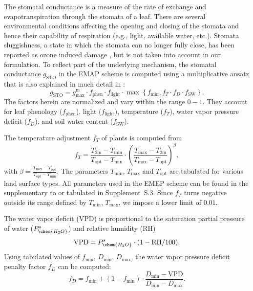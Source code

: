 \documentclass[gmd, manuscript]{copernicus}
\begin{document}
The stomatal conductance is a measure of the rate of  exchange and evapotranspiration through the stomata of a leaf. There are several environmental conditions affecting the opening and closing of the stomata and hence their capability of respiration (e.g., light, available water, etc.). Stomata sluggishness, a state in which the stomata can no longer fully close, has been reported as ozone induced damage \citep{SR:Hoshika2015}, but is not taken into account in our formulation. To reflect part of the underlying mechanism, the stomatal conductance $g_\text{STO}$ in the EMAP scheme is computed using a multiplicative ansatz that is also explained in much detail in \citet{ICP:MappingManual2017}:
%
\begin{equation}
  g_\text{STO} = g^\text{m}_\text{max} \cdot f_\text{phen} \cdot f_\text{light} \cdot \max{\left\{f_\text{min}, f_T \cdot f_D \cdot f_\text{SW}\right\}}.
  \label{eq:stomatal}
\end{equation}
%
The factors herein are normalized and vary within the range $0-1$. They account for leaf phenology ($f_\text{phen}$), light ($f_\text{light}$), temperature ($f_T$), water vapor pressure deficit ($f_D$), and soil water content ($f_\text{SW}$).

The temperature adjustment $f_T$ of plants is computed from
%
\begin{equation}
  f_T = \frac{T_\text{2m}-T_\text{min}}{T_\text{opt}-T_\text{min}} \cdot \left(\frac{T_{\text{max}}-T_\text{2m}}{T_{\text{max}}-T_\text{opt}}\right)^\beta, 
\end{equation}
with $\beta = \frac{T_\text{max}-T_\text{opt}}{T_\text{opt}-T_\text{min}}$. The parameters $T_\text{min}$, $T_\text{max}$ and $T_\text{opt}$ are tabulated for various land surface types. All parameters used in the EMEP scheme can be found in the supplementary to \citet{ACP:Simpson2012} or tabulated in Supplement~S.3. Since $f_T$ turns negative outside its range defined by $T_\text{min}$, $T_\text{max}$, we impose a lower limit of $0.01$.

The water vapor deficit (VPD) is proportional to the saturation partial pressure of water ($P_\chem{H_2O}^s$) and relative humidity ($\text{RH}$)
%
\begin{equation}
  \text{VPD} = P_\chem{H_2O}^s \cdot (1 - \text{RH}/100).
\end{equation}
%
Using tabulated values of $f_\text{min}$, $D_\text{min}$, $D_\text{max}$, the water vapor pressure deficit penalty factor $f_D$ can be computed:
%
\begin{equation}
  f_D = f_\text{min}+(1-f_\text{min}) \cdot \frac{D_\text{min} - \text{VPD}}{D_\text{min}-D_\text{max}}.
\end{equation}
\end{document}
